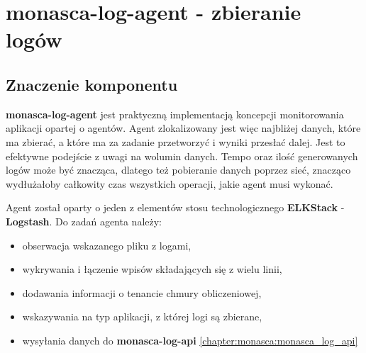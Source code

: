 \section{monasca-log-agent - zbieranie logów}
\label{chapter:monasca:monasca_log_agent}

    \subsection{Znaczenie komponentu}
    \textbf{monasca-log-agent} jest praktyczną implementacją koncepcji monitorowania aplikacji opartej o agentów.
    Agent zlokalizowany jest więc najbliżej danych, które ma zbierać, a które ma za zadanie przetworzyć i wyniki
    przesłać dalej. Jest to efektywne podejście z uwagi na wolumin danych. Tempo oraz ilość generowanych logów
    może być znacząca, dlatego też pobieranie danych poprzez sieć, znacząco wydłużałoby całkowity czas 
    wszystkich operacji, jakie agent musi wykonać.
    
    
    Agent został oparty o jeden z elementów stosu technologicznego \textbf{ELKStack} - \textbf{Logstash}.
    Do zadań agenta należy:
    \begin{itemize}
        \item obserwacja wskazanego pliku z logami,
        \item wykrywania i łączenie wpisów składających się z wielu linii,
        \item dodawania informacji o tenancie chmury obliczeniowej,
        \item wskazywania na typ aplikacji, z której logi są zbierane,
        \item wysyłania danych do \textbf{monasca-log-api} \ref{chapter:monasca:monasca_log_api}
    \end{itemize}
    
